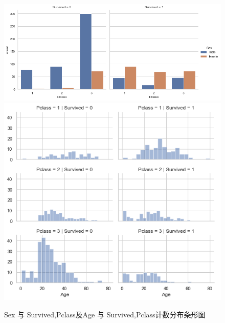 \clearpage


\begin{figure}[H]
	\centering
	\includegraphics[scale=0.34,angle=0]{images/9.png}	\includegraphics[scale=0.34,angle=0]{images/10.png}

	\caption{Sex 与 Survived,Pclass及Age 与 Survived,Pclass计数分布条形图}
	\label{9}
\end{figure}

